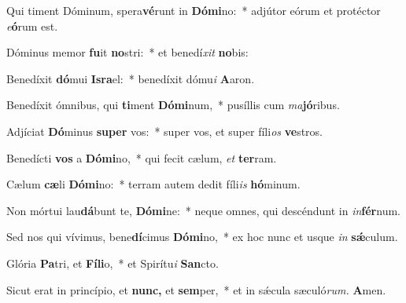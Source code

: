 \item Qui timent Dóminum, spera\textbf{vé}runt in \textbf{Dó}\textbf{mi}no:~* adjútor eórum et protéctor \textit{e}\textbf{ó}rum est.
\item Dóminus memor \textbf{fu}it \textbf{no}stri:~* et benedí\textit{xit} \textbf{no}bis:
\item Benedíxit \textbf{dó}mui \textbf{Is}\textbf{ra}el:~* benedíxit dómu\textit{i} \textbf{A}aron.
\item Benedíxit ómnibus, qui \textbf{ti}ment \textbf{Dó}\textbf{mi}num,~* pusíllis cum \textit{ma}\textbf{jó}ribus.
\item Adjíciat \textbf{Dó}minus \textbf{su}\textbf{per} vos:~* super vos, et super fíli\textit{os} \textbf{ve}stros.
\item Benedícti \textbf{vos} a \textbf{Dó}\textbf{mi}no,~* qui fecit cælum, \textit{et} \textbf{ter}ram.
\item Cælum \textbf{cæ}li \textbf{Dó}\textbf{mi}no:~* terram autem dedit fíli\textit{is} \textbf{hó}minum.
\item Non mórtui lau\textbf{dá}bunt te, \textbf{Dó}\textbf{mi}ne:~* neque omnes, qui descéndunt in \textit{in}\textbf{fér}num.
\item Sed nos qui vívimus, bene\textbf{dí}cimus \textbf{Dó}\textbf{mi}no,~* ex hoc nunc et usque \textit{in} \textbf{sǽ}culum.
\item Glória \textbf{Pa}tri, et \textbf{Fí}\textbf{li}o,~* et Spirítu\textit{i} \textbf{San}cto.
\item Sicut erat in princípio, et \textbf{nunc,} et \textbf{sem}per,~* et in sǽcula sæculó\textit{rum.} \textbf{A}men.
